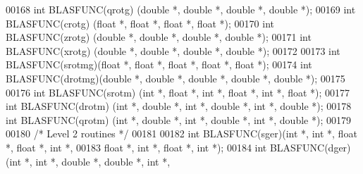 \begin{DoxyCode}
00168 \textcolor{keywordtype}{int}    BLASFUNC(qrotg) (\textcolor{keywordtype}{double} *, \textcolor{keywordtype}{double} *, \textcolor{keywordtype}{double} *, \textcolor{keywordtype}{double} *);
00169 \textcolor{keywordtype}{int}    BLASFUNC(crotg) (\textcolor{keywordtype}{float}  *, \textcolor{keywordtype}{float}  *, \textcolor{keywordtype}{float}  *, \textcolor{keywordtype}{float}  *);
00170 \textcolor{keywordtype}{int}    BLASFUNC(zrotg) (\textcolor{keywordtype}{double} *, \textcolor{keywordtype}{double} *, \textcolor{keywordtype}{double} *, \textcolor{keywordtype}{double} *);
00171 \textcolor{keywordtype}{int}    BLASFUNC(xrotg) (\textcolor{keywordtype}{double} *, \textcolor{keywordtype}{double} *, \textcolor{keywordtype}{double} *, \textcolor{keywordtype}{double} *);
00172 
00173 \textcolor{keywordtype}{int}    BLASFUNC(srotmg)(\textcolor{keywordtype}{float}  *, \textcolor{keywordtype}{float}  *, \textcolor{keywordtype}{float}  *, \textcolor{keywordtype}{float}  *, \textcolor{keywordtype}{float}  *);
00174 \textcolor{keywordtype}{int}    BLASFUNC(drotmg)(\textcolor{keywordtype}{double} *, \textcolor{keywordtype}{double} *, \textcolor{keywordtype}{double} *, \textcolor{keywordtype}{double} *, \textcolor{keywordtype}{double} *);
00175 
00176 \textcolor{keywordtype}{int}    BLASFUNC(srotm) (\textcolor{keywordtype}{int} *, \textcolor{keywordtype}{float}  *, \textcolor{keywordtype}{int} *, \textcolor{keywordtype}{float}  *, \textcolor{keywordtype}{int} *, \textcolor{keywordtype}{float}  *);
00177 \textcolor{keywordtype}{int}    BLASFUNC(drotm) (\textcolor{keywordtype}{int} *, \textcolor{keywordtype}{double} *, \textcolor{keywordtype}{int} *, \textcolor{keywordtype}{double} *, \textcolor{keywordtype}{int} *, \textcolor{keywordtype}{double} *);
00178 \textcolor{keywordtype}{int}    BLASFUNC(qrotm) (\textcolor{keywordtype}{int} *, \textcolor{keywordtype}{double} *, \textcolor{keywordtype}{int} *, \textcolor{keywordtype}{double} *, \textcolor{keywordtype}{int} *, \textcolor{keywordtype}{double} *);
00179 
00180 \textcolor{comment}{/* Level 2 routines */}
00181 
00182 \textcolor{keywordtype}{int} BLASFUNC(sger)(\textcolor{keywordtype}{int} *,    \textcolor{keywordtype}{int} *, \textcolor{keywordtype}{float} *,  \textcolor{keywordtype}{float} *, \textcolor{keywordtype}{int} *,
00183            \textcolor{keywordtype}{float} *,  \textcolor{keywordtype}{int} *, \textcolor{keywordtype}{float} *,  \textcolor{keywordtype}{int} *);
00184 \textcolor{keywordtype}{int} BLASFUNC(dger)(\textcolor{keywordtype}{int} *,    \textcolor{keywordtype}{int} *, \textcolor{keywordtype}{double} *, \textcolor{keywordtype}{double} *, \textcolor{keywordtype}{int} *,

\end{DoxyCode}
